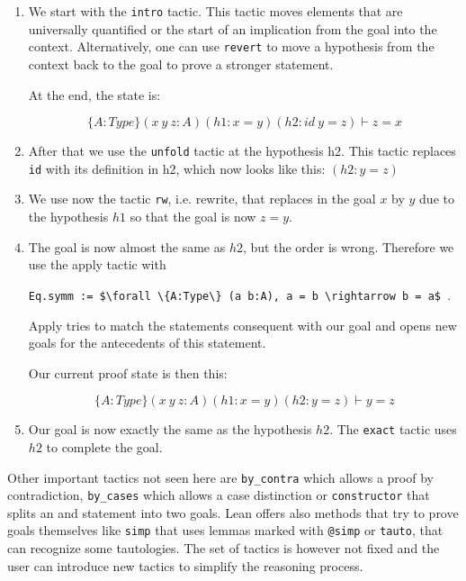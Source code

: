 \begin{enumerate}
    \item We start with the \lstinline|intro| tactic. This tactic moves elements that are universally quantified or the start of an implication from the goal into the context. Alternatively, one can use \lstinline|revert| to move a hypothesis from the context back to the goal to prove a stronger statement.
    
    At the end, the state is: 

    \[ \{A:Type\} (x\ y\ z: A) (h1: x = y) (h2: id\ y = z)\vdash z = x\]

    \item After that we use the \lstinline|unfold| tactic at the hypothesis h2. This tactic replaces \lstinline|id| with its definition in h2, which now looks like this: $(h2: y = z)$
    
    \item We use now the tactic \lstinline|rw|, i.e. rewrite, that replaces in the goal $x$ by $y$ due to the hypothesis $h1$ so that the goal is now $z = y$.
    \item The goal is now almost the same as $h2$, but the order is wrong. Therefore we use the apply tactic with
    
    \lstinline|Eq.symm := $\forall \{A:Type\} (a b:A), a = b \rightarrow b = a$ |. 

    Apply tries to match the statements consequent with our goal and opens new goals for the antecedents of this statement.

    Our current proof state is then this:

    \[ \{A:Type\} (x\ y\ z: A) (h1: x = y) (h2: y = z)\vdash y = z\]

    \item Our goal is now exactly the same as the hypothesis $h2$. The \lstinline|exact| tactic uses $h2$ to complete the goal.
\end{enumerate}

Other important tactics not seen here are \lstinline|by_contra| which allows a proof by contradiction, \lstinline|by_cases| which allows a case distinction or \lstinline|constructor| that splits an and statement into two goals. Lean offers also methods that try to prove goals themselves like \lstinline|simp| that uses lemmas marked with \lstinline|@simp| or \lstinline|tauto|, that can recognize some tautologies. The set of tactics is however not fixed and the user can introduce new tactics to simplify the reasoning process.

